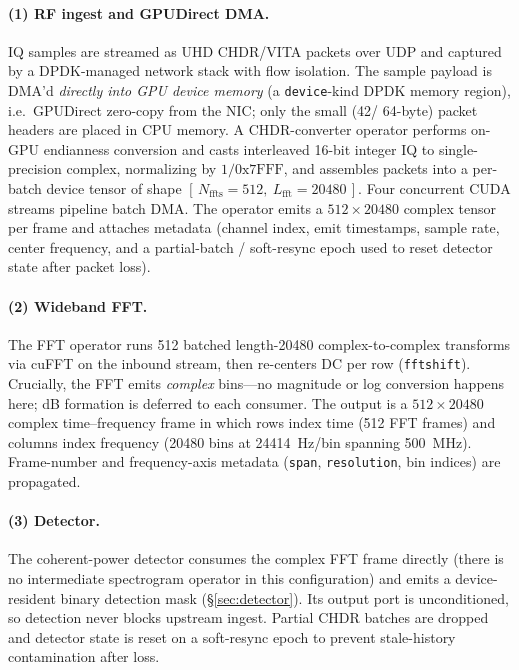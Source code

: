 \paragraph{(1) RF ingest and GPUDirect DMA.}
IQ samples are streamed as UHD CHDR/VITA packets over UDP and captured by a
DPDK-managed network stack with flow isolation. The sample payload is DMA'd
\emph{directly into GPU device memory} (a \texttt{device}-kind DPDK memory
region), i.e.\ GPUDirect zero-copy from the NIC; only the small (\SI{42}{}/
\SI{64}{}-byte) packet headers are placed in CPU memory. A CHDR-converter
operator performs on-GPU endianness conversion and casts interleaved
\num[]{16}-bit integer IQ to single-precision complex, normalizing by
$1/\text{0x7FFF}$, and assembles packets into a per-batch device tensor of shape
$[\,N_{\text{ffts}}\!=\!512,\ L_{\text{fft}}\!=\!20480\,]$. Four concurrent CUDA
streams pipeline batch DMA. The operator emits a $512\times20480$ complex tensor
per frame and attaches metadata (channel index, emit timestamps, sample rate,
center frequency, and a partial-batch / soft-resync epoch used to reset detector
state after packet loss).

\paragraph{(2) Wideband FFT.}
The FFT operator runs \num{512} batched length-\num{20480} complex-to-complex
transforms via cuFFT on the inbound stream, then re-centers DC per row
(\texttt{fftshift}). Crucially, the FFT emits \emph{complex} bins---no magnitude
or log conversion happens here; dB formation is deferred to each consumer. The
output is a $512\times20480$ complex time--frequency frame in which rows index
time (\num{512} FFT frames) and columns index frequency (\num{20480} bins at
\SI{24414}{\hertz}/bin spanning \SI{500}{\mega\hertz}). Frame-number and
frequency-axis metadata (\texttt{span}, \texttt{resolution}, bin indices) are
propagated.

\paragraph{(3) Detector.}
The coherent-power detector consumes the complex FFT frame directly (there is no
intermediate spectrogram operator in this configuration) and emits a
device-resident binary detection mask (\S\ref{sec:detector}). Its output port is
unconditioned, so detection never blocks upstream ingest. Partial CHDR batches
are dropped and detector state is reset on a soft-resync epoch to prevent
stale-history contamination after loss.

